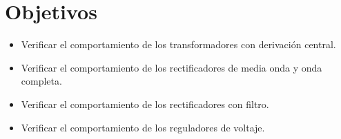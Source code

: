 \section{Objetivos}
\begin{itemize}
    \item Verificar el comportamiento de los transformadores con derivación
        central.
    \item Verificar el comportamiento de los rectificadores de media onda y onda
        completa.
    \item Verificar el comportamiento de los rectificadores con filtro.
    \item Verificar el comportamiento de los reguladores de voltaje.
\end{itemize}

